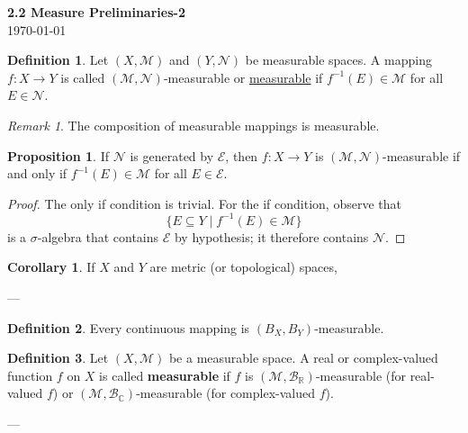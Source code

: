 \documentclass[11pt]{article}
\theoremstyle{definition}
\newtheorem{definition}{Definition}[section]
\newtheorem{proposition}{Proposition}[section]
\newtheorem{corollary}{Corollary}[section]
\theoremstyle{remark}
\newtheorem{remark}{Remark}[section]
\begin{document}
\begin{center}
{\Large\textbf{2.2 Measure Preliminaries-2}}\\
\vspace{0.3cm}
{\normalsize\today}
\end{center}
\vspace{0.5cm}


\begin{definition}\label{def:measurable-function}
Let $(X, \mathcal{M})$ and $(Y, \mathcal{N})$ be measurable spaces. A mapping $f \colon X \to Y$ is called $(\mathcal{M}, \mathcal{N})$-measurable or \underline{measurable} if $f^{-1}(E) \in \mathcal{M}$ for all $E \in \mathcal{N}$.
\end{definition}

\begin{remark}\label{rem:composition-measurable}
The composition of measurable mappings is measurable.
\end{remark}

\begin{proposition}\label{prop:measurable-generated}
If $\mathcal{N}$ is generated by $\mathcal{E}$, then $f \colon X \to Y$ is $(\mathcal{M}, \mathcal{N})$-measurable if and only if $f^{-1}(E) \in \mathcal{M}$ for all $E \in \mathcal{E}$.
\end{proposition}

\begin{proof}
The only if condition is trivial. For the if condition, observe that
\[
\{ E \subseteq Y \mid f^{-1}(E) \in \mathcal{M} \}
\]
is a $\sigma$-algebra that contains $\mathcal{E}$ by hypothesis; it therefore contains $\mathcal{N}$.
\end{proof}

\begin{corollary}\label{cor:measurable-metric}
If $X$ and $Y$ are metric (or topological) spaces,
\end{corollary}

---
\begin{definition}\label{def:measurable_mapping}
Every continuous mapping is $(B_X, B_Y)$-measurable.
\end{definition}

\begin{definition}\label{def:measurable_function}
Let $(X, \mathcal{M})$ be a measurable space. A real or complex-valued function $f$ on $X$ is called \textbf{measurable} if $f$ is $(\mathcal{M}, \mathcal{B}_{\mathbb{R}})$-measurable (for real-valued $f$) or $(\mathcal{M}, \mathcal{B}_{\mathbb{C}})$-measurable (for complex-valued $f$).
\end{definition}
---
\end{document}

